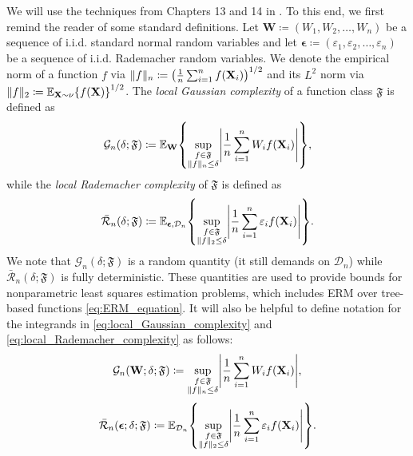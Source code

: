 \documentclass[11pt]{article}
\newcommand{\bW}{\mathbf{W}}
\newcommand{\bX}{\mathbf{X}}
\newcommand{\beps}{\boldsymbol{\epsilon}}
\DeclarePairedDelimiter{\braces}{\lbrace}{\rbrace}
\DeclarePairedDelimiter{\paren}{(}{)}
\DeclarePairedDelimiter{\abs}{|}{|}
\DeclarePairedDelimiter{\norm}{\|}{\|}
\newcommand{\E}{\mathbb{E}}
\newcommand{\xmeasure}{\nu}
\newcommand{\nsamples}{n}
\newcommand{\data}[1][n]{\mathcal{D}_{#1}}
\newcommand{\funcclass}{\mathfrak{F}}
\begin{document}
We will use the techniques from Chapters 13 and 14 in \cite{wainwright2019high}.
To this end, we first remind the reader of some standard definitions.
Let $\bW \coloneqq (W_1,W_2,\ldots,W_{\nsamples})$ be a sequence of i.i.d. standard normal random variables and let $\beps \coloneqq (\varepsilon_1,\varepsilon_2,\ldots,\varepsilon_\nsamples)$ be a sequence of i.i.d. Rademacher random variables.
We denote the empirical norm of a function $f$ via $\|f\|_\nsamples \coloneqq \paren*{\frac{1}{n}\sum_{i=1}^nf(\bX_i)}^{1/2}$ and its $L^2$ norm via $\|f\|_2 \coloneqq \E_{\bX\sim\xmeasure}\braces*{f(\bX)}^{1/2}$.
The \emph{local Gaussian complexity} of a function class $\funcclass$ is defined as
\begin{equation}
\label{eq:local_Gaussian_complexity}
    \mathcal{G}_n(\delta;\funcclass) \coloneqq \E_{\bW}\braces*{\sup_{\substack{f \in \funcclass \\
    \norm{f}_n \leq \delta}} \abs*{\frac{1}{n}\sum_{i=1}^n W_i f(\bX_i)}},
\end{equation}
while the \emph{local Rademacher complexity} of $\funcclass$ is defined as
\begin{equation}
\label{eq:local_Rademacher_complexity}
    \bar{\mathcal{R}}_n(\delta;\funcclass) \coloneqq \E_{\beps,\data}\braces*{\sup_{\substack{f \in \funcclass \\
    \norm{f}_2 \leq \delta}} \abs*{\frac{1}{n}\sum_{i=1}^n \varepsilon_i f(\bX_i)}}. 
\end{equation}
We note that $\mathcal{G}_n(\delta;\funcclass)$ is a random quantity (it still demands on $\data$) while $\bar{\mathcal{R}}_n(\delta;\funcclass)$ is fully deterministic.
These quantities are used to provide bounds for nonparametric least squares estimation problems, which includes ERM over tree-based functions \eqref{eq:ERM_equation}.
It will also be helpful to define notation for the integrands in \eqref{eq:local_Gaussian_complexity} and \eqref{eq:local_Rademacher_complexity} as follows:
\begin{equation}
    \mathcal{G}_n(\bW; \delta;\funcclass) \coloneqq \sup_{\substack{f \in \funcclass \\
    \norm{f}_n \leq \delta}} \abs*{\frac{1}{n}\sum_{i=1}^n W_i f(\bX_i)},
\end{equation}
\begin{equation}
    \bar{\mathcal{R}}_n(\beps;\delta;\funcclass) \coloneqq \E_{\data}\braces*{\sup_{\substack{f \in \funcclass \\
    \norm{f}_2 \leq \delta}} \abs*{\frac{1}{n}\sum_{i=1}^n \varepsilon_i f(\bX_i)}}. 
\end{equation}
\end{document}
